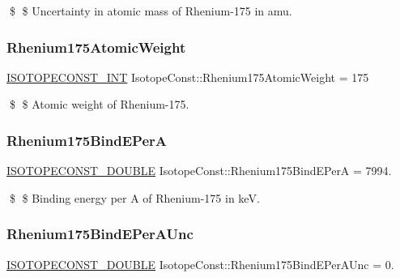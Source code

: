 \$ \$ Uncertainty in atomic mass of Rhenium-\/175 in amu. \mbox{\label{group___isotope_const-_rhenium-_re175_ga778d0eab1952bf3591f0f083b55f42e2}} 
\subsubsection{\texorpdfstring{Rhenium175\+Atomic\+Weight}{Rhenium175AtomicWeight}}
{\footnotesize\ttfamily \mbox{\hyperlink{group___isotope_const-_macros_ga5f18360b3e99483a35c32d789e62621c}{I\+S\+O\+T\+O\+P\+E\+C\+O\+N\+S\+T\+\_\+\+I\+NT}} Isotope\+Const\+::\+Rhenium175\+Atomic\+Weight = 175}

\$ \$ Atomic weight of Rhenium-\/175. \mbox{\label{group___isotope_const-_rhenium-_re175_ga34dd514705f2589b36005acf2386adf0}} 
\subsubsection{\texorpdfstring{Rhenium175\+Bind\+E\+PerA}{Rhenium175BindEPerA}}
{\footnotesize\ttfamily \mbox{\hyperlink{group___isotope_const-_macros_ga8f45a7272ce02c0b4c65c44636ed719a}{I\+S\+O\+T\+O\+P\+E\+C\+O\+N\+S\+T\+\_\+\+D\+O\+U\+B\+LE}} Isotope\+Const\+::\+Rhenium175\+Bind\+E\+PerA = 7994.}

\$ \$ Binding energy per A of Rhenium-\/175 in keV. \mbox{\label{group___isotope_const-_rhenium-_re175_ga42231e56b19f4240d85540f856aa8313}} 
\subsubsection{\texorpdfstring{Rhenium175\+Bind\+E\+Per\+A\+Unc}{Rhenium175BindEPerAUnc}}
{\footnotesize\ttfamily \mbox{\hyperlink{group___isotope_const-_macros_ga8f45a7272ce02c0b4c65c44636ed719a}{I\+S\+O\+T\+O\+P\+E\+C\+O\+N\+S\+T\+\_\+\+D\+O\+U\+B\+LE}} Isotope\+Const\+::\+Rhenium175\+Bind\+E\+Per\+A\+Unc = 0.}

